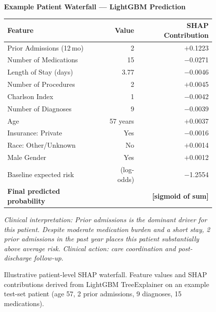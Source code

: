 \documentclass[11pt,letterpaper]{article}
\begin{document}
\begin{figure}[H]
\centering
\begin{tcolorbox}[
  enhanced, colback=niw-box, colframe=niw-blue,
  boxrule=0.6pt, arc=4pt, left=8pt, right=8pt, top=6pt, bottom=6pt,
  width=0.88\textwidth
]
\small
\textbf{Example Patient Waterfall --- LightGBM Prediction}

\medskip
\begin{tabular}{@{}p{5.5cm}rr@{}}
\toprule
\textbf{Feature} & \textbf{Value} & \textbf{SHAP Contribution} \\
\midrule
Prior Admissions (12\,mo)   & 2            & $+$0.1223 \\
Number of Medications       & 15           & $-$0.0271 \\
Length of Stay (days)       & 3.77         & $-$0.0046 \\
Number of Procedures        & 2            & $+$0.0045 \\
Charlson Index              & 1            & $-$0.0042 \\
Number of Diagnoses         & 9            & $-$0.0039 \\
Age                         & 57 years     & $+$0.0037 \\
Insurance: Private          & Yes          & $-$0.0016 \\
Race: Other/Unknown         & No           & $+$0.0014 \\
Male Gender                 & Yes          & $+$0.0012 \\
\midrule
Baseline expected risk      & (log-odds)   & $-$1.2554  \\
\textbf{Final predicted probability} & & \textbf{[sigmoid of sum]} \\
\bottomrule
\end{tabular}

\smallskip
\textcolor{niw-gray}{\footnotesize\textit{Clinical interpretation: Prior admissions is the dominant driver for this patient. Despite moderate medication burden and a short stay, 2 prior admissions in the past year places this patient substantially above average risk. Clinical action: care coordination and post-discharge follow-up.}}
\end{tcolorbox}
\caption{Illustrative patient-level SHAP waterfall. Feature values and SHAP contributions derived from LightGBM TreeExplainer on an example test-set patient (age 57, 2 prior admissions, 9 diagnoses, 15 medications).}
\label{fig:shap_waterfall}
\end{figure}
\end{document}
